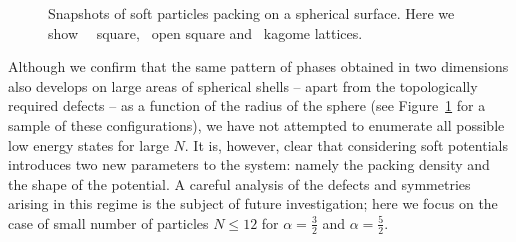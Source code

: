 {\begin{figure}
	\begin{center}

	\end{center}
\caption[Snapshots of soft particles on a spherical surface]{Snapshots of soft particles packing on a spherical surface.
Here we show ~~square, ~open square and ~kagome lattices.}\label{spheres}	
\end{figure}

Although we confirm that the same pattern of phases obtained in two dimensions 
also develops on large areas of spherical shells -- apart from the topologically required defects --
as a function of  the radius of the sphere (see Figure~\ref{spheres} for a sample of these configurations), we have not attempted to 
enumerate all possible low energy states for large $N$. It is, however, clear that considering
soft potentials introduces two new parameters to the system: namely the packing density and the 
shape of the potential. A careful analysis of the defects and symmetries arising in this 
regime is the subject of future investigation; here we focus on
the case of small number of particles $N\leq12$ for $\alpha=\frac{3}{2}$ and $\alpha=\frac{5}{2}$.

}
